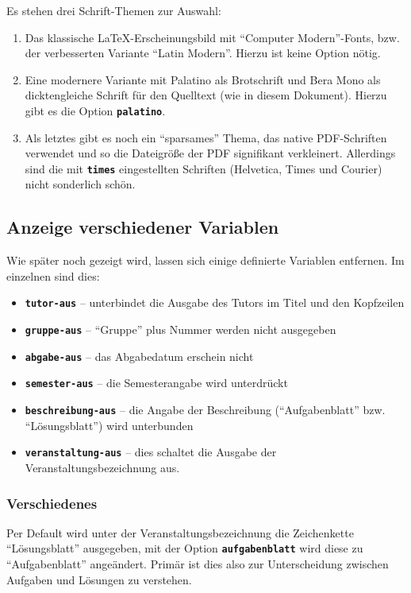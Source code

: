 \documentclass[palatino,gruppe-aus,semester-aus,veranstaltung-aus,abgabe-aus,tutor-aus,utf]{uhb-inf}
\def\option#1{\texttt{\bfseries #1}}
\begin{document}
Es stehen drei Schrift-Themen zur Auswahl:

\begin{enumerate}
	\item Das klassische \LaTeX-Erscheinungsbild mit "`Computer Modern"'-Fonts, bzw. der verbesserten Variante "`Latin Modern"'. Hierzu ist keine Option nötig.
	\item Eine modernere Variante mit Palatino als Brotschrift und Bera Mono als dicktengleiche Schrift für den Quelltext (wie in diesem Dokument). Hierzu gibt es die Option \option{palatino}.
	\item Als letztes gibt es noch ein "`sparsames"' Thema, das native PDF-Schriften verwendet und so die Dateigröße der PDF signifikant verkleinert. Allerdings sind die mit \option{times} eingestellten Schriften (Helvetica, Times und Courier) nicht sonderlich schön.
\end{enumerate}

\subsection{Anzeige verschiedener Variablen}

Wie später noch gezeigt wird, lassen sich einige definierte Variablen entfernen. Im einzelnen sind dies:

\begin{itemize}
	\item \option{tutor-aus} -- unterbindet die Ausgabe des Tutors im Titel und den Kopfzeilen
	\item \option{gruppe-aus} -- "`Gruppe"' plus Nummer werden nicht ausgegeben
	\item \option{abgabe-aus} -- das Abgabedatum erschein nicht
	\item \option{semester-aus} -- die Semesterangabe wird unterdrückt
	\item \option{beschreibung-aus} -- die Angabe der Beschreibung ("`Aufgabenblatt"' bzw. "`Lösungsblatt"') wird unterbunden
	\item \option{veranstaltung-aus} -- dies schaltet die Ausgabe der Veranstaltungsbezeichnung aus.
\end{itemize}

\subsubsection{Verschiedenes}

Per Default wird unter der Veranstaltungsbezeichnung die Zeichenkette "`Lösungsblatt"' ausgegeben, mit der Option \option{aufgabenblatt} wird diese zu "`Aufgabenblatt"' angeändert. Primär ist dies also zur Unterscheidung zwischen Aufgaben und Lösungen zu verstehen.
\end{document}
